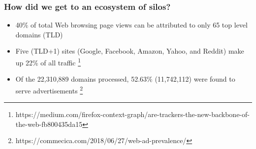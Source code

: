 \documentclass[aspectratio=169]{beamer}
\begin{document}
{
%
\begin{frame}
\frametitle{How did we get to an ecosystem of silos?}
\begin{itemize}
\item{40\% of total Web browsing page views can be attributed to only 65 top level domains (TLD)}
\item{Five (TLD+1) sites (Google, Facebook, Amazon, Yahoo, and Reddit) make up 22\% of all traffic
\footnote{https://medium.com/firefox-context-graph/are-trackers-the-new-backbone-of-the-web-fb800435da15}}
\item{Of the 22,310,889 domains processed, 52.63\% (11,742,112) were found to serve advertisements
\footnote{https://commecica.com/2018/06/27/web-ad-prevalence/}}


\end{itemize}
\end{frame}
}
\end{document}
